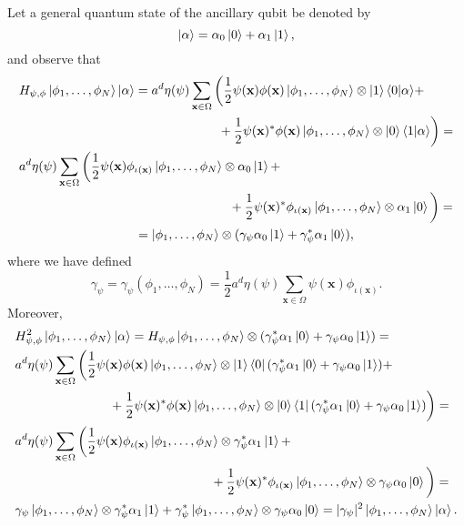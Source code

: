\documentclass[a4paper,10pt]{report}
\begin{document}
Let a general quantum state of the ancillary qubit be denoted by
\begin{equation}
\ket{\alpha} = \alpha_0\ket{0} + \alpha_1\ket{1},
\end{equation} 
and observe that
\begin{align}
&H_{\psi,\phi}\ket{\phi_1,\dots,\phi_N}\ket{\alpha} = a^d\eta(\psi)\sum_{\mathbf{x}\in\Omega}\bigg(\frac{1}{2}\psi(\mathbf{x})\phi(\mathbf{x})\ket{\phi_1,\dots,\phi_N}\otimes\ket{1}\langle 0|\alpha\rangle + \nonumber\\
&\hspace{5.5cm}+ \frac{1}{2}\psi(\mathbf{x})^*\phi(\mathbf{x})\ket{\phi_1,\dots,\phi_N}\otimes\ket{0}\langle 1|\alpha\rangle\bigg) = \nonumber\\
&a^d\eta(\psi)\sum_{\mathbf{x}\in\Omega}\bigg(\frac{1}{2}\psi(\mathbf{x})\phi_{\iota(\mathbf{x})}\ket{\phi_1,\dots,\phi_N}\otimes\alpha_0\ket{1} + \nonumber\\
&\hspace{5.8cm}+ \frac{1}{2}\psi(\mathbf{x})^*\phi_{\iota(\mathbf{x})}\ket{\phi_1,\dots,\phi_N}\otimes\alpha_1\ket{0}\bigg) = \nonumber\\
&\hspace{3.2cm}=\ket{\phi_1,\dots,\phi_N}\otimes(\gamma_\psi\alpha_0\ket{1} + \gamma_\psi^*\alpha_1\ket{0}),
\label{eq:wave_prep_phi}
\end{align}
where we have defined
\begin{equation}
\gamma_\psi = \gamma_\psi(\phi_1,\dots,\phi_N) = \frac{1}{2}a^d\eta(\psi)\sum_{\mathbf{x}\in\Omega}\psi(\mathbf{x})\phi_{\iota(\mathbf{x})}.
\end{equation}
Moreover,
\begin{align}
&H^2_{\psi,\phi}\ket{\phi_1,\dots,\phi_N}\ket{\alpha} = H_{\psi,\phi}\ket{\phi_1,\dots,\phi_N}\otimes(\gamma_\psi^*\alpha_1\ket{0}+\gamma_\psi\alpha_0\ket{1}) = \nonumber\\
&a^d\eta(\psi)\sum_{\mathbf{x}\in\Omega}\bigg(\frac{1}{2}\psi(\mathbf{x})\phi(\mathbf{x})\ket{\phi_1,\dots,\phi_N}\otimes\ket{1}\bra{0}(\gamma_\psi^*\alpha_1\ket{0}+\gamma_\psi\alpha_0\ket{1}) + \nonumber\\
&\hspace{2.6cm}+ \frac{1}{2}\psi(\mathbf{x})^*\phi(\mathbf{x})\ket{\phi_1,\dots,\phi_N}\otimes\ket{0}\bra{1}(\gamma_\psi^*\alpha_1\ket{0}+\gamma_\psi\alpha_0\ket{1})\bigg) = \nonumber\\
&a^d\eta(\psi)\sum_{\mathbf{x}\in\Omega}\bigg(\frac{1}{2}\psi(\mathbf{x})\phi_{\iota(\mathbf{x})}\ket{\phi_1,\dots,\phi_N}\otimes\gamma_\psi^*\alpha_1\ket{1} + \nonumber\\
&\hspace{5.4cm}+ \frac{1}{2}\psi(\mathbf{x})^*\phi_{\iota(\mathbf{x})}\ket{\phi_1,\dots,\phi_N}\otimes\gamma_\psi\alpha_0\ket{0}\bigg) = \nonumber\\
&\gamma_\psi\ket{\phi_1,\dots,\phi_N}\otimes\gamma_\psi^*\alpha_1\ket{1} + \gamma_\psi^*\ket{\phi_1,\dots,\phi_N}\otimes\gamma_\psi\alpha_0\ket{0} = |\gamma_\psi|^2\ket{\phi_1,\dots,\phi_N}\ket{\alpha}.
\label{eq:wave_prep_phi_sqrd}
\end{align}
\end{document}
